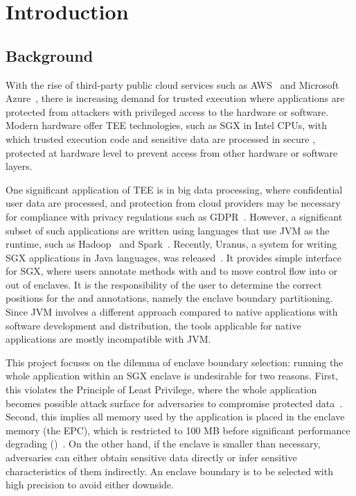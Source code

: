 \section{Introduction}\label{sec:introduction}

\subsection{Background}\label{subsec:background}
With the rise of third-party public cloud services
such as \ac{AWS}~\cite{aws} and Microsoft Azure~\cite{azure},
there is increasing demand for trusted execution where
applications are protected from
attackers with privileged access to the hardware or software.
Modern hardware offer \ac{TEE} technologies,
such as \ac{SGX} in Intel CPUs,
with which trusted execution code and sensitive data
are processed in secure ,
protected at hardware level to prevent access
from other hardware or software layers.

One significant application of \ac{TEE} is in big data processing,
where confidential user data are processed,
and protection from cloud providers may be necessary
for compliance with privacy regulations such as GDPR~\cite{gdpr}.
However, a significant subset of such applications are written
using languages that use \ac{JVM} as the runtime,
such as Hadoop~\cite{apachehadoop} and Spark~\cite{apachespark}.
Recently, Uranus, a system for
writing \ac{SGX} applications in Java languages, was released~\cite{uranus}.
It provides simple interface for \ac{SGX},
where users annotate methods with  and 
to move control flow into or out of enclaves.
It is the responsibility of the user to determine the correct positions
for the  and  annotations,
namely the enclave boundary partitioning.
Since \ac{JVM} involves a different approach compared to native applications
with software development and distribution,
the tools applicable for native applications are mostly incompatible with \ac{JVM}.

This project focuses on the dilemma of enclave boundary selection:
running the whole application within an \ac{SGX} enclave is undesirable for two reasons.
First, this violates the Principle of Least Privilege,
where the whole application becomes possible attack surface
for adversaries to compromise protected data~\cite{glamdring}.
Second, this implies all memory used by the application
is placed in the enclave memory (the \ac{EPC}),
which is restricted to 100 MB before significant performance degrading
()~\cite{uranus}.
On the other hand, if the enclave is smaller than necessary,
adversaries can either obtain sensitive data directly or
infer sensitive characteristics of them indirectly.
An enclave boundary is to be selected with high precision to avoid either downside.

